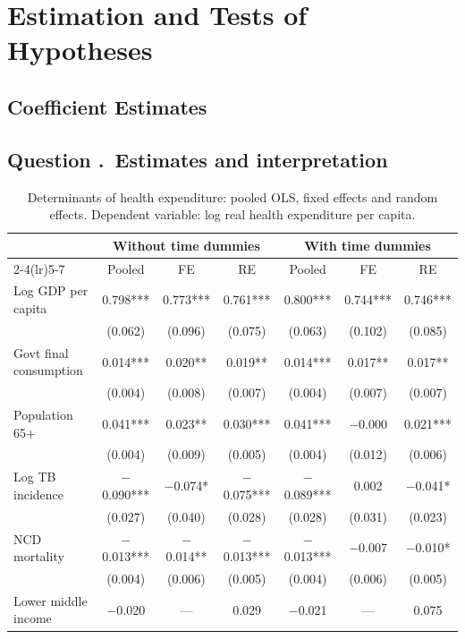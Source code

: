 \documentclass[11pt,a4paper]{article}
\newcounter{qnum}
\newcommand{\question}[1]{\subsection*{Question \stepcounter{qnum}\theqnum.\ #1}}
\begin{document}
\section{Estimation and Tests of Hypotheses}

\subsection{Coefficient Estimates}

\question{Estimates and interpretation}

\begin{table}[H]
\centering
\footnotesize
\caption{Determinants of health expenditure: pooled OLS, fixed effects and
random effects. Dependent variable: log real health expenditure per capita.}
\label{tab:estimates}
\begin{tabular}{@{}l cccccc@{}}
\toprule
& \multicolumn{3}{c}{Without time dummies} & \multicolumn{3}{c}{With time dummies} \\
\cmidrule(lr){2-4}\cmidrule(lr){5-7}
& Pooled & FE & RE & Pooled & FE & RE \\
\midrule
Log GDP per capita & 0.798*** & 0.773*** & 0.761*** & 0.800*** & 0.744*** & 0.746*** \\
 & (0.062) & (0.096) & (0.075) & (0.063) & (0.102) & (0.085) \\
\addlinespace[2pt]
Govt final consumption & 0.014*** & 0.020** & 0.019** & 0.014*** & 0.017** & 0.017** \\
 & (0.004) & (0.008) & (0.007) & (0.004) & (0.007) & (0.007) \\
\addlinespace[2pt]
Population 65+ & 0.041*** & 0.023** & 0.030*** & 0.041*** & $-$0.000 & 0.021*** \\
 & (0.004) & (0.009) & (0.005) & (0.004) & (0.012) & (0.006) \\
\addlinespace[2pt]
Log TB incidence & $-$0.090*** & $-$0.074* & $-$0.075*** & $-$0.089*** & 0.002 & $-$0.041* \\
 & (0.027) & (0.040) & (0.028) & (0.028) & (0.031) & (0.023) \\
\addlinespace[2pt]
NCD mortality & $-$0.013*** & $-$0.014** & $-$0.013*** & $-$0.013*** & $-$0.007 & $-$0.010* \\
 & (0.004) & (0.006) & (0.005) & (0.004) & (0.006) & (0.005) \\
\addlinespace[2pt]
Lower middle income & $-$0.020 & --- & 0.029 & $-$0.021 & --- & 0.075 \\

\end{tabular}
\end{table}
\end{document}
